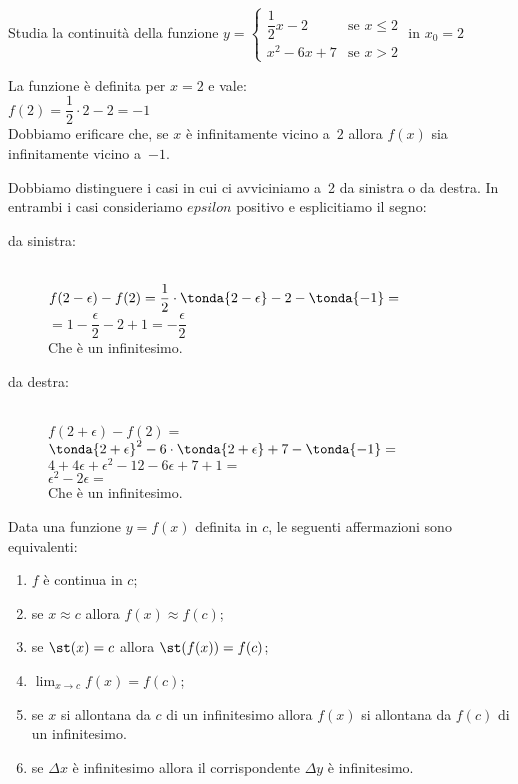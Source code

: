 \begin{esempio}
Studia la continuità della funzione 
\(y=\begin{cases} 
    \dfrac{1}{2}x-2 & \mbox{se }x \leqslant 2 \\ 
    x^2-6x+7 & \mbox{se }x > 2
  \end{cases}\)
\quad in \(x_0=2\)

La funzione è definita per \(x=2\) e vale:\\
\(f(2) = \dfrac{1}{2} \cdot 2-2 = -1\)\\
Dobbiamo  erificare che, se $x$ è infinitamente vicino a~$2$ allora 
\(f(x)\) sia infinitamente vicino a~$-1$.

\begin{minipage}{.49\textwidth}
Dobbiamo distinguere i casi in cui ci avviciniamo a~2 da sinistra o da 
destra. In entrambi i casi consideriamo \(epsilon\) positivo e esplicitiamo 
il segno:
\begin{description}
 \item [da sinistra:]
 ~\\
\(f(2-\epsilon) - f(2) =
  \dfrac{1}{2} \cdot \tonda{2-\epsilon}-2-\tonda{-1} =\)\\
\(= 1 - \dfrac{\epsilon}{2} -2 +1 = -\dfrac{\epsilon}{2}\)\\
Che è un infinitesimo.
 \item [da destra:]
 ~\\
\(f(2+\epsilon) - f(2) =\)\\
\(\tonda{2+\epsilon}^2-6 \cdot \tonda{2+\epsilon}+7-\tonda{-1} =\)\\
\(4+4\epsilon+\epsilon^2-12-6 \epsilon+7+1 =\)\\
\(\epsilon^2-2 \epsilon =\)\\
Che è un infinitesimo.
\end{description}
\end{minipage}
\begin{minipage}{.49\textwidth}
\begin{center}\graficob\end{center}
\end{minipage}

\end{esempio}

Data una funzione \(y=f(x)\) definita in \(c\), le seguenti 
affermazioni sono equivalenti:

\begin{enumerate}[noitemsep]
 \item \(f\) è continua in \(c\);
 \item se \(x \approx c\) allora \(f(x) \approx f(c)\);
 \item se \(\st(x) = c\) allora \(\st(f(x)) = f(c)\);
 \item \(\lim_{x \to c} f(x) = f(c)\);
 \item se \(x\) si allontana da \(c\) di un infinitesimo allora 
   \(f(x)\) si allontana da \(f(c)\) di un infinitesimo.
 \item se \(\Delta x\) è infinitesimo allora il corrispondente \(\Delta y\) 
   è infinitesimo.
\end{enumerate}

